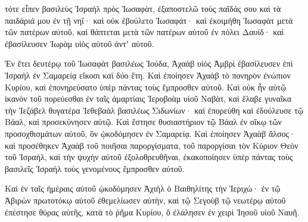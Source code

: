 {τότε εἶπεν βασιλεὺς Ἰσραὴλ πρὸς Ἰωσαφὰτ, ἐξαποστελῶ τοὺς παῖδάς σου καὶ τὰ παιδάριά μου ἐν τῇ νηΐ· καὶ οὐκ ἐβούλετο Ἰωσαφάτ·
καὶ ἐκοιμήθη Ἰωσαφὰτ μετὰ τῶν πατέρων αὐτοῦ, καὶ θάπτεται μετὰ τῶν πατέρων αὐτοῦ ἐν πόλει Δαυίδ· καὶ ἐβασίλευσεν Ἰωρὰμ υἱὸς αὐτοῦ ἀντʼ αὐτοῦ.
\par }{\PP {}Ἐν ἔτει δευτέρῳ τοῦ Ἰωσαφὰτ βασιλέως Ἰούδα, Ἀχαὰβ υἱὸς Ἀμβρὶ ἐβασίλευσεν ἐπὶ Ἰσραὴλ ἐν Σαμαρείᾳ εἴκοσι καὶ δύο ἔτη.
Καὶ ἐποίησεν Ἀχαὰβ τὸ πονηρὸν ἐνώπιον Κυρίου, καὶ ἐπονηρεύσατο ὑπὲρ πάντας τοὺς ἔμπροσθεν αὐτοῦ.
Καὶ οὐκ ἦν αὐτῷ ἱκανὸν τοῦ πορεύεσθαι ἐν ταῖς ἁμαρτίαις Ἱεροβοὰμ υἱοῦ Ναβὰτ, καὶ ἔλαβε γυναῖκα τὴν Ἰεζάβελ θυγατέρα Ἰεθεβαὰλ βασιλέως Σιδωνίων· καὶ ἐπορεύθη καὶ ἐδούλευσε τῷ Βάαλ, καὶ προσεκύνησεν αὐτῷ.
Καὶ ἔστησε θυσιαστήριον τῷ Βάαλ ἐν οἴκῳ τῶν προσοχθισμάτων αὐτοῦ, ὃν ᾠκοδόμησεν ἐν Σαμαρείᾳ.
Καὶ ἐποίησεν Ἀχαὰβ ἄλσος· καὶ προσέθηκεν Ἀχαὰβ τοῦ ποιῆσαι παροργίσματα, τοῦ παροργίσαι τὸν Κύριον Θεὸν τοῦ Ἰσραὴλ, καὶ τὴν ψυχὴν αὐτοῦ ἐξολοθρευθῆναι, ἐκακοποίησεν ὑπὲρ πάντας τοὺς βασιλεῖς Ἰσραὴλ τοὺς γενομένους ἔμπροσθεν αὐτοῦ.
\par }{\PP {}Καὶ ἐν ταῖς ἡμέραις αὐτοῦ ᾠκοδόμησεν Ἀχιὴλ ὁ Βαιθηλίτης τὴν Ἱεριχώ· ἐν τῷ Ἀβιρὼν πρωτοτόκῳ αὐτοῦ ἐθεμελίωσεν αὐτὴν, καὶ τῷ Σεγοὺβ τῷ νεωτέρῳ αὐτοῦ ἐπέστησε θύρας αὐτῆς, κατὰ τὸ ῥῆμα Κυρίου, ὃ ἐλάλησεν ἐν χειρὶ Ἰησοῦ υἱοῦ Ναυῆ.

}
